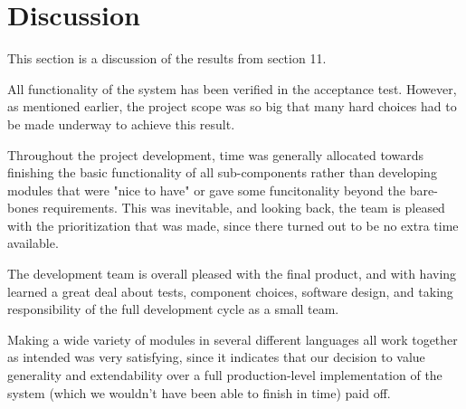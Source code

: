 \newpage
\chapter{Discussion}
This section is a discussion of the results from section 11. 

All functionality of the system has been verified in the acceptance test. However, as mentioned earlier, the project scope was so big that many hard choices had to be made underway to achieve this result.

Throughout the project development, time was generally allocated towards finishing the basic functionality of all sub-components rather than developing modules that were "nice to have" or gave some funcitonality beyond the bare-bones requirements. This was inevitable, and looking back, the team is pleased with the prioritization that was made, since there turned out to be no extra time available.

The development team is overall pleased with the final product, and with having learned a great deal about tests, component choices, software design, and taking responsibility of the full development cycle as a small team. 

Making a wide variety of modules in several different languages all work together as intended was very satisfying, since it indicates that our decision to value generality and extendability over a full production-level implementation of the system (which we wouldn't have been able to finish in time) paid off.